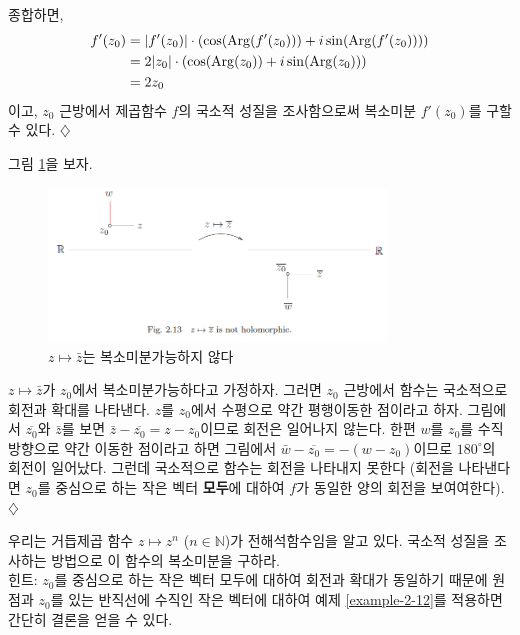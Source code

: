 \begin{salt_example}
종합하면,
\begin{align*}
f'(z_0) &= |f'(z_0)| \cdot
\left( \cos(\mathop{\mathrm{Arg}}(f'(z_0))) + i \sin(\mathop{\mathrm{Arg}}(f'(z_0))) \right) \\
&= 2|z_0|\cdot \left(\cos(\mathop{\mathrm{Arg}}(z_0)) + i \sin(\mathop{\mathrm{Arg}}(z_0)) \right) \\
&= 2z_0
\end{align*}
이고,
$z_0$ 근방에서 제곱함수 $f$의 국소적 성질을 조사함으로써
복소미분 $f'(z_0)$를 구할 수 있다.
\hfill $\diamondsuit$
\end{salt_example}

\begin{salt_example}
\label{example-2-13}
그림 \ref{fig-2-13}을 보자.

\begin{figure}[!h]
\begin{center}
\includegraphics[width=0.8\textwidth]{./SaltChapter/fig-2-13}
\end{center}
\caption{$z\mapsto \bar z$는 복소미분가능하지 않다}
\label{fig-2-13}
\end{figure}

$z\mapsto \bar z$가 $z_0$에서 복소미분가능하다고 가정하자.
그러면 $z_0$ 근방에서 함수는 국소적으로 회전과 확대를 나타낸다.
$z$를 $z_0$에서 수평으로 약간 평행이동한 점이라고 하자.
그림에서 $\overline{z_0}$와 $\bar z$를 보면
$\bar z - \overline{z_0} = z-z_0$이므로 회전은 일어나지 않는다.
한편 $w$를 $z_0$를 수직방향으로 약간 이동한 점이라고 하면
그림에서 $\bar w - \overline{z_0} =  - (w-z_0)$이므로
$180^\circ$의 회전이 일어났다.
그런데 국소적으로 함수는 회전을 나타내지 못한다
(회전을 나타낸다면 $z_0$를 중심으로 하는  작은 벡터 {\bf 모두}에 대하여 
$f$가 동일한 양의 회전을 보여여한다).
\hfill $\diamondsuit$
\end{salt_example}

\begin{salt_exercise}\label{ex-2-16}
우리는 거듭제곱 함수 $z\mapsto z^n$ ($n\in\mathbb N$)가 전해석함수임을 알고 있다.
국소적 성질을 조사하는 방법으로 이 함수의 복소미분을 구하라. \\[1ex]
힌트:  $z_0$를 중심으로 하는  작은 벡터 모두에 대하여
회전과 확대가 동일하기 때문에
원점과 $z_0$를 있는 반직선에 수직인 작은 벡터에 대하여 
예제 \ref{example-2-12}를 적용하면 간단히 결론을 얻을 수 있다.
\end{salt_exercise}

